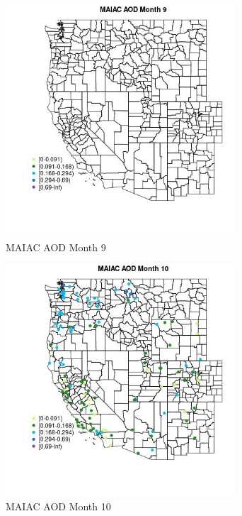 \begin{figure} 
\centering  
\includegraphics[width=0.77\textwidth]{Code_Outputs/Report_ML_input_PM25_Step4_part_e_de_duplicated_aveswNAs_MapObsMo9MAIAC_AOD.jpg} 
\caption{\label{fig:Report_ML_input_PM25_Step4_part_e_de_duplicated_aveswNAsMapObsMo9MAIAC_AOD}MAIAC AOD Month 9} 
\end{figure} 
 

\begin{figure} 
\centering  
\includegraphics[width=0.77\textwidth]{Code_Outputs/Report_ML_input_PM25_Step4_part_e_de_duplicated_aveswNAs_MapObsMo10MAIAC_AOD.jpg} 
\caption{\label{fig:Report_ML_input_PM25_Step4_part_e_de_duplicated_aveswNAsMapObsMo10MAIAC_AOD}MAIAC AOD Month 10} 
\end{figure} 
 

